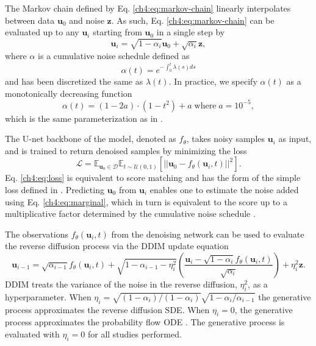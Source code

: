 The Markov chain defined by Eq. \ref{ch4:eq:markov-chain} linearly interpolates between data $\mathbf{u}_0$ and noise $\mathbf{z}$. As such, Eq. \ref{ch4:eq:markov-chain} can be evaluated up to any $\mathbf{u}_i$ starting from $\mathbf{u}_0$ in a single step by
\begin{equation}
    \mathbf{u}_i = \sqrt{1-\alpha_i}\mathbf{u}_0 + \sqrt{\alpha_i}\mathbf{z},
\end{equation}
where $\alpha$ is a cumulative noise schedule defined as
\begin{equation}
    \label{ch4:eq:marginal}
    \alpha(t) = e^{-\int_0^t \lambda(s)ds}
\end{equation}
and has been discretized the same as $\lambda(t)$. In practice, we specify $\alpha(t)$ as a monotonically decreasing function
\begin{equation}
    \alpha(t) = (1-2a)\cdot(1-t^2) + a \; \mathrm{where} \; a=10^{-5},
\end{equation}
which is the same parameterization as in \cite{equivariant-diffusion-model}.

The U-net backbone of the model, denoted as $f_\theta$, takes noisy samples $\mathbf{u}_i$ as input, and is trained to return denoised samples by minimizing the loss
\begin{equation}
    \label{ch4:eq:loss}
    \mathcal{L} = \mathbb{E}_{\mathbf{u}_0 \in \mathcal{D}} \mathbb{E}_{t\sim\mathcal{U}(0,1)} \left[ ||\mathbf{u}_0 - f_\theta \left(\mathbf{u}_i, t\right)||^2 \right].
\end{equation}
Eq. \ref{ch4:eq:loss} is equivalent to score matching and has the form of the simple loss defined in \cite{ddpm}. Predicting $\mathbf{u}_0$ from $\mathbf{u}_i$ enables one to estimate the noise added using Eq. \ref{ch4:eq:marginal}, which in turn is equivalent to the score up to a multiplicative factor determined by the cumulative noise schedule \cite{three-interpretations}.

The observations $f_\theta(\mathbf{u}_i,t)$ from the denoising network can be used to evaluate the reverse diffusion process via the DDIM \cite{ddim} update equation
\begin{equation}
    \mathbf{u}_{i-1} = \sqrt{\alpha_{i-1}} f_\theta (\mathbf{u}_i, t) + \sqrt{1 - \alpha_{i-1} - \eta^2_i} \left( \frac{\mathbf{u}_i - \sqrt{1-\alpha_i}f_\theta(\mathbf{u}_i,t)}{\sqrt{\alpha_i}} \right) + \eta_i^2 \mathbf{z}.
\end{equation}
DDIM treats the variance of the noise in the reverse diffusion, $\eta_i^2$, as a hyperparameter. When $\eta_i = \sqrt{(1-\alpha_i)/(1-\alpha_i)} \sqrt{1-\alpha_i/\alpha_{i-1}}$ the generative process approximates the reverse diffusion SDE. When $\eta_i = 0$, the generative process approximates the probability flow ODE \cite{sgm-sde}. The generative process is evaluated with $\eta_i=0$ for all studies performed.


